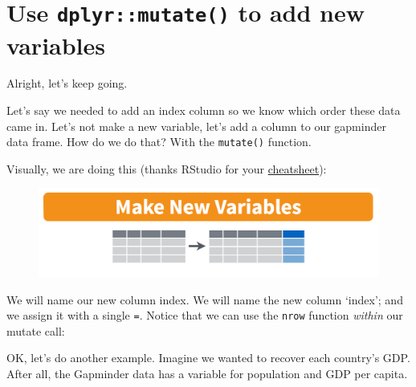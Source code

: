 \documentclass[]{book}
\newenvironment{Shaded}{\begin{snugshade}}{\end{snugshade}}
\newcommand{\KeywordTok}[1]{\textcolor[rgb]{0.13,0.29,0.53}{\textbf{{#1}}}}
\newcommand{\DataTypeTok}[1]{\textcolor[rgb]{0.13,0.29,0.53}{{#1}}}
\newcommand{\DecValTok}[1]{\textcolor[rgb]{0.00,0.00,0.81}{{#1}}}
\newcommand{\StringTok}[1]{\textcolor[rgb]{0.31,0.60,0.02}{{#1}}}
\newcommand{\NormalTok}[1]{{#1}}
\theoremstyle{definition}
\theoremstyle{definition}
\theoremstyle{definition}
\theoremstyle{remark}
\begin{document}
\section{\texorpdfstring{Use \texttt{dplyr::mutate()} to add new
variables}{Use dplyr::mutate() to add new variables}}\label{use-dplyrmutate-to-add-new-variables}

Alright, let's keep going.

Let's say we needed to add an index column so we know which order these
data came in. Let's not make a new variable, let's add a column to our
gapminder data frame. How do we do that? With the \texttt{mutate()}
function.

Visually, we are doing this (thanks RStudio for your
\href{http://www.rstudio.com/wp-content/uploads/2015/02/data-wrangling-cheatsheet.pdf}{cheatsheet}):

\begin{figure}[htbp]
\centering
\includegraphics{img/rstudio-cheatsheet-mutate.png}
\caption{}
\end{figure}

We will name our new column index. We will name the new column `index';
and we assign it with a single \texttt{=}. Notice that we can use the
\texttt{nrow} function \emph{within} our mutate call:

\begin{Shaded}
\end{Shaded}

OK, let's do another example. Imagine we wanted to recover each
country's GDP. After all, the Gapminder data has a variable for
population and GDP per capita.

\begin{Shaded}
\end{Shaded}
\end{document}
